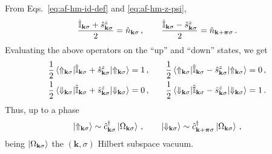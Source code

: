 From Eqs.~\eqref{eq:af-hm-id-def} and \eqref{eq:af-hm-z-psi},
\[
	\frac{\hat {\mathbb{I}}_{\mathbf{k}\sigma} + \hat s_{\mathbf{k}\sigma}^z}{2} = \hat n_{\mathbf{k}\sigma} \, ,
	\qquad
	\frac{\hat {\mathbb{I}}_{\mathbf{k}\sigma} - \hat s_{\mathbf{k}\sigma}^z}{2} = \hat n_{\mathbf{k}+\bm{\pi}\sigma} \, .
\]
Evaluating the above operators on the ``up'' and ``down'' states, we get
\[
\begin{aligned}
	\frac{1}{2} \mel{\Uparrow_{\mathbf{k}\sigma}}{\hat {\mathbb{I}}_{\mathbf{k}\sigma} + \hat s_{\mathbf{k}\sigma}^z}{\Uparrow_{\mathbf{k}\sigma}} &= 1 \, , \\
	\frac{1}{2} \mel{\Downarrow_{\mathbf{k}\sigma}}{\hat {\mathbb{I}}_{\mathbf{k}\sigma} + \hat s_{\mathbf{k}\sigma}^z}{\Downarrow_{\mathbf{k}\sigma}} &= 0 \, ,
\end{aligned}
\qquad
\begin{aligned}
	\frac{1}{2} \mel{\Uparrow_{\mathbf{k}\sigma}}{\hat {\mathbb{I}}_{\mathbf{k}\sigma} - \hat s_{\mathbf{k}\sigma}^z}{\Uparrow_{\mathbf{k}\sigma}} &= 0 \, , \\
	\frac{1}{2} \mel{\Downarrow_{\mathbf{k}\sigma}}{\hat {\mathbb{I}}_{\mathbf{k}\sigma} - \hat s_{\mathbf{k}\sigma}^z}{\Downarrow_{\mathbf{k}\sigma}} &= 1 \, .
\end{aligned}
\]
Thus, up to a phase
\[
	\ket{\Uparrow_{\mathbf{k}\sigma}} \sim \hat c_{\mathbf{k}\sigma}^\dagger \ket{\Omega_{\mathbf{k}\sigma}} \, ,
	\qquad
	\ket{\Downarrow_{\mathbf{k}\sigma}} \sim \hat c_{\mathbf{k}+\bm{\pi}\sigma}^\dagger \ket{\Omega_{\mathbf{k}\sigma}} \, ,
\]
being $\ket{\Omega_{\mathbf{k}\sigma}}$ the $(\mathbf{k},\sigma)$ Hilbert subspace vacuum. 

